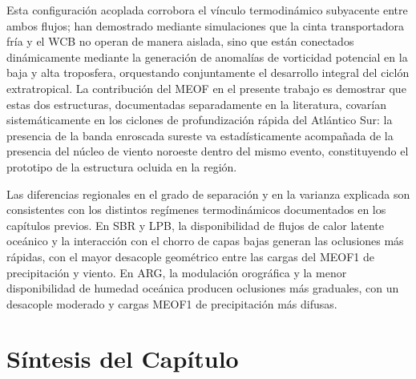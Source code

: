 Esta configuración acoplada corrobora el vínculo termodinámico subyacente entre ambos flujos; \citet{schemm2014ccb} han demostrado mediante simulaciones que la cinta transportadora fría y el WCB no operan de manera aislada, sino que están conectados dinámicamente mediante la generación de anomalías de vorticidad potencial en la baja y alta troposfera, orquestando conjuntamente el desarrollo integral del ciclón extratropical. 
La contribución del MEOF en el presente trabajo es demostrar que estas dos estructuras, documentadas separadamente en la literatura, covarían sistemáticamente en los ciclones de profundización rápida del Atlántico Sur: la presencia de la banda enroscada sureste va estadísticamente acompañada de la presencia del núcleo de viento noroeste dentro del mismo evento, constituyendo el prototipo de la estructura ocluida en la región.

Las diferencias regionales en el grado de separación y en la varianza explicada son consistentes con los distintos regímenes termodinámicos documentados en los capítulos previos. En SBR y LPB, la disponibilidad de flujos de calor latente oceánico y la interacción con el chorro de capas bajas \citep{gramcianinov2019properties} generan las oclusiones más rápidas, con el mayor desacople geométrico entre las cargas del MEOF1 de precipitación y viento. En ARG, la modulación orográfica y la menor disponibilidad de humedad oceánica producen oclusiones más graduales, con un desacople moderado y cargas MEOF1 de precipitación más difusas. 

\section{Síntesis del Capítulo}
\label{sec:sintesis_meof}

